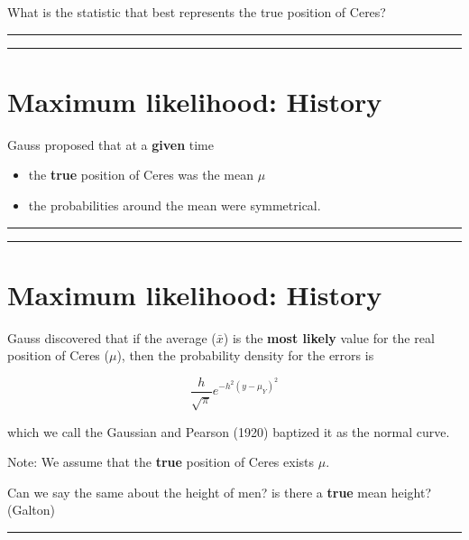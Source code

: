 \documentclass[
]{book}
\providecommand{\tightlist}{%
  \setlength{\itemsep}{0pt}\setlength{\parskip}{0pt}}
\begin{document}
What is the statistic that best represents the true position of Ceres?

\begin{center}\rule{0.5\linewidth}{0.5pt}\end{center}

\begin{center}\rule{0.5\linewidth}{0.5pt}\end{center}

\hypertarget{maximum-likelihood-history-3}{%
\section{Maximum likelihood: History}\label{maximum-likelihood-history-3}}

Gauss proposed that at a \textbf{given} time

\begin{itemize}
\tightlist
\item
  the \textbf{true} position of Ceres was the mean \(\mu\)
\item
  the probabilities around the mean were symmetrical.
\end{itemize}

\begin{center}\rule{0.5\linewidth}{0.5pt}\end{center}

\begin{center}\rule{0.5\linewidth}{0.5pt}\end{center}

\hypertarget{maximum-likelihood-history-4}{%
\section{Maximum likelihood: History}\label{maximum-likelihood-history-4}}

Gauss discovered that if the average (\(\bar{x}\)) is the \textbf{most likely} value for the real position of Ceres (\(\mu\)), then the probability density for the errors is

\[\frac{h}{\sqrt{\pi}}e^{-h^2(y-\mu_Y)^2}\]

which we call the Gaussian and Pearson (1920) baptized it as the normal curve.

Note: We assume that the \textbf{true} position of Ceres exists \(\mu\).

Can we say the same about the height of men? is there a \textbf{true} mean height? (Galton)

\begin{center}\rule{0.5\linewidth}{0.5pt}\end{center}
\end{document}
